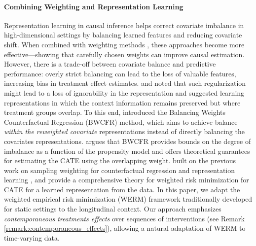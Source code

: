 \documentclass[10pt]{article} %
\begin{document}
\paragraph{Combining Weighting and Representation Learning} Representation learning in causal inference helps correct covariate imbalance in high-dimensional settings by balancing learned features and reducing covariate shift. When combined with weighting methods \citep{zubizarreta2015stable, li2018balancing, johansson2018learningweighted, hassanpour2019counterfactual}, these approaches become more effective—showing that carefully chosen weights can improve causal estimation. However, there is a trade-off between covariate balance and predictive performance: overly strict balancing can lead to the loss of valuable features, increasing bias in treatment effect estimates. \cite{zhang2020learning} and \cite{johansson2019support} noted that such regularization might lead to a loss of ignorability in the representation and suggested learning representations in which the context information remains preserved but where treatment groups overlap. To this end, \cite{assaad2021counterfactual} introduced the Balancing Weights Counterfactual Regression (BWCFR) method, which aims to achieve balance \emph{within the reweighted covariate} representations instead of directly balancing the covariates representations. \cite{assaad2021counterfactual} argues that BWCFR provides bounds on the degree of imbalance as a function of the propensity model and offers theoretical guarantees for estimating the CATE using the overlapping weight. \cite{johansson2022generalization} built on the previous work on sampling weighting for counterfactual regression and representation learning \citep{johansson2016learning, shalit2017estimating, kallus2020deepmatch, jung2020learningWERM, assaad2021counterfactual}, and provide a comprehensive theory for weighted risk minimization for CATE for a learned representation from the data. In this paper, we adapt the weighted empirical risk minimization (WERM) framework traditionally developed for static settings to the longitudinal context. Our approach emphasizes \emph{contemporaneous treatments effects} over sequences of interventions (see Remark \ref{remark:contemporaneous_effects}), allowing a natural adaptation of WERM to time-varying data.
\end{document}

